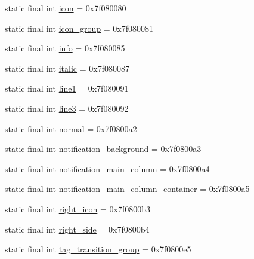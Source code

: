\begin{DoxyCompactItemize}
static final int \mbox{\hyperlink{classandroid_1_1support_1_1graphics_1_1drawable_1_1_r_1_1id_ae0a7affdbd0448660c604b248aeae54e}{icon}} = 0x7f080080
\item 
static final int \mbox{\hyperlink{classandroid_1_1support_1_1graphics_1_1drawable_1_1_r_1_1id_abd07d96a991ba4fb2e5b58fa7200390e}{icon\+\_\+group}} = 0x7f080081
\item 
static final int \mbox{\hyperlink{classandroid_1_1support_1_1graphics_1_1drawable_1_1_r_1_1id_ab008f7982ba0395901c5402d04046006}{info}} = 0x7f080085
\item 
static final int \mbox{\hyperlink{classandroid_1_1support_1_1graphics_1_1drawable_1_1_r_1_1id_ab3f1b9d2d2677cbbc18db586d7599aa7}{italic}} = 0x7f080087
\item 
static final int \mbox{\hyperlink{classandroid_1_1support_1_1graphics_1_1drawable_1_1_r_1_1id_a85dc5f1d60bf411fcbb75962f798eceb}{line1}} = 0x7f080091
\item 
static final int \mbox{\hyperlink{classandroid_1_1support_1_1graphics_1_1drawable_1_1_r_1_1id_a3e475586ebabb2808945680e4629b8bc}{line3}} = 0x7f080092
\item 
static final int \mbox{\hyperlink{classandroid_1_1support_1_1graphics_1_1drawable_1_1_r_1_1id_a89ccce30f996f9eb78ef5db9f3a17071}{normal}} = 0x7f0800a2
\item 
static final int \mbox{\hyperlink{classandroid_1_1support_1_1graphics_1_1drawable_1_1_r_1_1id_a27f2265bcdbeb02d1a337c7e4a3052d7}{notification\+\_\+background}} = 0x7f0800a3
\item 
static final int \mbox{\hyperlink{classandroid_1_1support_1_1graphics_1_1drawable_1_1_r_1_1id_aabf00f5888a3194f048b6f29f102f04f}{notification\+\_\+main\+\_\+column}} = 0x7f0800a4
\item 
static final int \mbox{\hyperlink{classandroid_1_1support_1_1graphics_1_1drawable_1_1_r_1_1id_aa32710627d3a79e215b72284bb4fea0c}{notification\+\_\+main\+\_\+column\+\_\+container}} = 0x7f0800a5
\item 
static final int \mbox{\hyperlink{classandroid_1_1support_1_1graphics_1_1drawable_1_1_r_1_1id_aad264117d09758f8112d92656aada0a1}{right\+\_\+icon}} = 0x7f0800b3
\item 
static final int \mbox{\hyperlink{classandroid_1_1support_1_1graphics_1_1drawable_1_1_r_1_1id_a5e84b5089abd6844223c1ef63cd3c51f}{right\+\_\+side}} = 0x7f0800b4
\item 
static final int \mbox{\hyperlink{classandroid_1_1support_1_1graphics_1_1drawable_1_1_r_1_1id_abb7a6bbdadfbd2d8103c347898624888}{tag\+\_\+transition\+\_\+group}} = 0x7f0800e5

\end{DoxyCompactItemize}
